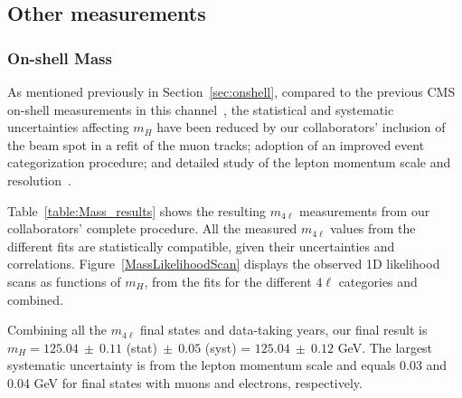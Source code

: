 \subsection{Other measurements}

\subsubsection{On-shell Mass}

As mentioned previously in Section~\ref{sec:onshell}, compared to the previous CMS on-shell \Hboson measurements in this channel~\cite{Sirunyan:2017exp}, the statistical and systematic uncertainties affecting $m_{H}$ have been reduced by our collaborators' inclusion of the beam spot in a refit of the muon tracks; adoption of an improved event categorization procedure; and detailed study of the lepton momentum scale and resolution~\cite{PhysRevD.111.092014}.



Table~\ref{table:Mass_results} shows the resulting $m_{4\ell}$ measurements from our collaborators' complete procedure. All the measured $m_{4\ell}$ values from the different fits are statistically compatible, given their uncertainties and correlations. Figure~\ref{MassLikelihoodScan} displays the observed 1D likelihood scans as functions of $m_H$, from the fits for the different $4\ell$ categories and combined.

Combining all the $m_{4\ell}$ final states and data-taking years, our final result is 
$m_H = 125.04~\pm~0.11$ (stat)$~\pm~0.05$ (syst) = $125.04~\pm~0.12$ GeV.
The largest systematic uncertainty is from the lepton momentum scale and equals 0.03 and 0.04 GeV for final states with muons and electrons, respectively.

